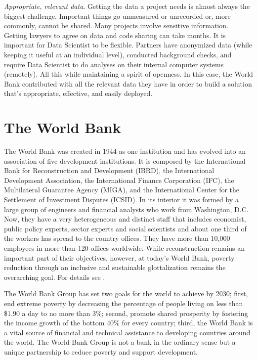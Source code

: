 \textit{Appropriate, relevant data}. Getting the data a project  needs is almost always the biggest challenge. Important things go unmeasured or unrecorded or, more commonly, cannot be shared. Many projects involve  sensitive information. Getting lawyers to agree on data and code sharing can take months. It is important for Data Scientist to be flexible. Partners have anonymized data (while keeping it useful at an individual level), conducted background checks, and require Data Scientist to do analyses on their internal computer systems (remotely). All this while maintaining a spirit of openness.  In this case, the World Bank contributed with all the relevant data they have in order to build a solution that's appropriate, effective, and easily deployed.

\section{The World Bank}\label{sec_intro_wb}

The World Bank was created in 1944 as one institution and has evolved into an association of five development institutions. It is composed by  the International Bank for Reconstruction and Development (IBRD), the International Development Association, the International Finance Corporation (IFC), the Multilateral Guarantee Agency (MIGA), and the International Center for the Settlement of Investment Disputes (ICSID). In its interior it was formed by a large group of engineers and financial analysts who work from Washington, D.C. Now, they have a very heterogeneous and distinct staff that includes economist, public policy experts, sector experts and social scientists and about one third of the workers has spread to the country offices. They have more than 10,000 employees in more than 120 offices worldwide. While reconstruction remains an important part of their objectives, however, at today's World Bank, poverty reduction through an inclusive and sustainable glottalization remains the overarching goal. For details see \parencite{wb_history}. 

The World Bank Group has set two goals for the world to achieve by 2030; first, end extreme poverty by decreasing the percentage of people living on less than \$1.90 a day to no more than 3\%; second, promote shared prosperity by fostering the income growth of the bottom 40\% for every country; third, the World Bank is a vital source of financial and technical assistance to developing countries around the world. The World Bank Group is not a bank in the ordinary sense but a unique partnership to reduce poverty and support development. \parencite{wb_about}

